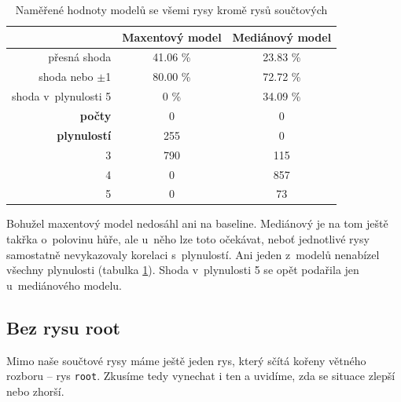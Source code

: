 \documentclass[12pt,a4paper]{report}
\begin{document}
\begin{table}[!htbp]
\begin{center}
\begin{tabular}{|r|c|c|}
\hline
 & \textbf{Maxentový model} & \textbf{Mediánový model} \\
 \hline
přesná shoda & 41.06 \%  & 23.83 \%  \\
\hline
shoda nebo $\pm$1 & 80.00 \% & 72.72 \%  \\
\hline
shoda v~plynulosti 5 &\color{red} 0 \% & 34.09 \%   \\
\hline
     \textbf{počty} \quad 1 & \color{red}0   & \color{red}0   \\
\textbf{plynulostí} \quad 2 & 255 & \color{red}0   \\
                          3 & 790 & 115 \\
                          4 & \color{red}0   & 857 \\
                          5 & \color{red}0   & 73  \\
\hline
\end{tabular}
\caption{Naměřené hodnoty modelů se všemi rysy kromě rysů součtových}\label{tb:woutsums}
\end{center}
\end{table}

Bohužel maxentový model nedosáhl ani na baseline. Mediánový je na tom ještě takřka o~polovinu hůře, ale u~něho lze toto očekávat, neboť jednotlivé rysy samostatně nevykazovaly korelaci s~plynulostí. Ani jeden z~modelů nenabízel všechny plynulosti (tabulka \ref{tb:woutsums}). Shoda v~plynulosti 5 se opět podařila jen u~mediánového modelu.

\subsection{Bez rysu root}
Mimo naše součtové rysy máme ještě jeden rys, který sčítá kořeny větného rozboru -- rys \texttt{root}. Zkusíme tedy vynechat i ten a uvidíme, zda se situace zlepší nebo zhorší.
\end{document}
